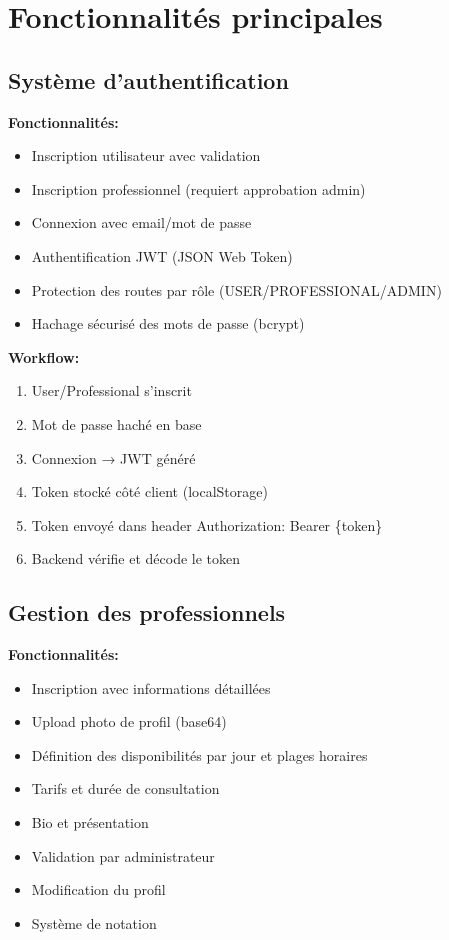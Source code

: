 \documentclass[12pt,a4paper]{article}
\begin{document}
\section{Fonctionnalités principales}

\subsection{Système d'authentification}

\textbf{Fonctionnalités:}
\begin{itemize}
    \item[\checkmark] Inscription utilisateur avec validation
    \item[\checkmark] Inscription professionnel (requiert approbation admin)
    \item[\checkmark] Connexion avec email/mot de passe
    \item[\checkmark] Authentification JWT (JSON Web Token)
    \item[\checkmark] Protection des routes par rôle (USER/PROFESSIONAL/ADMIN)
    \item[\checkmark] Hachage sécurisé des mots de passe (bcrypt)
\end{itemize}

\textbf{Workflow:}
\begin{enumerate}
    \item User/Professional s'inscrit
    \item Mot de passe haché en base
    \item Connexion → JWT généré
    \item Token stocké côté client (localStorage)
    \item Token envoyé dans header Authorization: Bearer \{token\}
    \item Backend vérifie et décode le token
\end{enumerate}

\subsection{Gestion des professionnels}

\textbf{Fonctionnalités:}
\begin{itemize}
    \item[\checkmark] Inscription avec informations détaillées
    \item[\checkmark] Upload photo de profil (base64)
    \item[\checkmark] Définition des disponibilités par jour et plages horaires
    \item[\checkmark] Tarifs et durée de consultation
    \item[\checkmark] Bio et présentation
    \item[\checkmark] Validation par administrateur
    \item[\checkmark] Modification du profil
    \item[\checkmark] Système de notation
\end{itemize}
\end{document}
